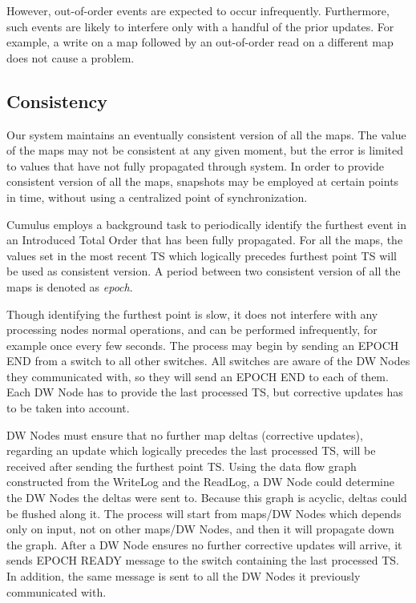 \documentclass{sig-semester}
\begin{document}
However, out-of-order events are expected to occur infrequently. Furthermore, such events are likely to interfere only with a handful of the prior updates. For example, a write on a map followed by an out-of-order read on a different map does not cause a problem.

\subsection{Consistency}

Our system maintains an eventually consistent version of all the maps. The value of the maps may not be consistent at any given moment, but the error is limited to values that have not fully propagated through system. In order to provide consistent version of all the maps, snapshots may be employed at certain points in time, without using a centralized point of synchronization.

Cumulus employs a background task to periodically identify the furthest event in an Introduced Total Order that has been fully propagated. For all the maps, the values set in the most recent TS which logically precedes furthest point TS will be used as consistent version. A period between two consistent version of all the maps is denoted as \textit{epoch}.

Though identifying the furthest point is slow, it does not interfere with any processing nodes normal operations, and can be performed infrequently, for example once every few seconds. The process may begin by sending an EPOCH END from a switch to all other switches. All switches are aware of the DW Nodes they communicated with, so they will send an EPOCH END to each of them. Each DW Node has to provide the last processed TS, but corrective updates has to be taken into account.

DW Nodes must ensure that no further map deltas (corrective updates), regarding an update which logically precedes the last processed TS, will be received after sending the furthest point TS. Using the data flow graph constructed from the WriteLog and the ReadLog, a DW Node could determine the DW Nodes the deltas were sent to. Because this graph is acyclic, deltas could be flushed along it. The process will start from maps/DW Nodes which depends only on input, not on other maps/DW Nodes, and then it will propagate down the graph. After a DW Node ensures no further corrective updates will arrive, it sends EPOCH READY message to the switch containing the last processed TS. In addition, the same message is sent to all the DW Nodes it previously communicated with.
\end{document}
